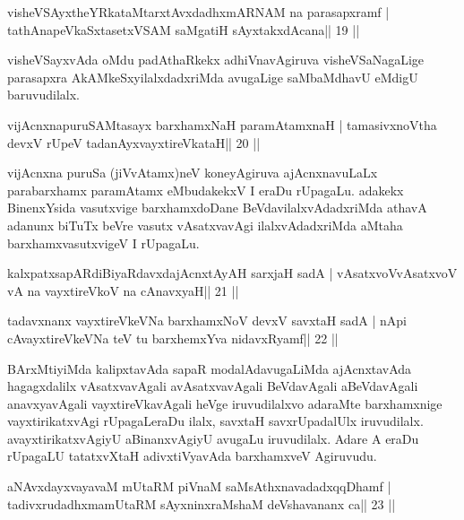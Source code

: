 \begin{shl}
visheVSAyxtheYRkataMtarxtAvxdadhxmARNAM na parasapxramf |
tathA\s napeVkaSxtasetxVSAM saMgatiH sAyxtakxdAcana\hfill || 19 ||
\end{shl}

\begin{artha}
visheVSayxvAda oMdu padAthaRkekx adhiVnavAgiruva visheVSaNagaLige parasapxra AkAMkeSxyilalxdadxriMda avugaLige saMbaMdhavU eMdigU baruvudilalx.
\end{artha}

\begin{shl}
vijAcnxnapuruSAMtasayx barxhamxNaH paramAtamxnaH |
tamasivxnoV\s tha devxV rUpeV tadanAyxvayxtireVkataH\hfill || 20 ||
\end{shl}

\begin{artha}
vijAcnxna puruSa (jiVvAtamx)neV koneyAgiruva ajAcnxnavuLaLx parabarxhamx paramAtamx eMbudakekxV I eraDu rUpagaLu. adakekx BinenxYsida vasutxvige barxhamxdoDane BeVdavilalxvAdadxriMda athavA adanunx biTuTx beVre vasutx vAsatxvavAgi ilalxvAdadxriMda aMtaha barxhamxvasutxvigeV I rUpagaLu.
\end{artha}



\begin{shl}
kalxpatxsapARdiBiyaRdavxdajAcnxtAyAH sarxjaH sadA |
vAsatxvoV\s vAsatxvoV vA na vayxtireVkoV na cAnavxyaH\hfill || 21 ||
\end{shl}

\begin{shl}
tadavxnanx vayxtireVkeVNa barxhamxNoV devxV savxtaH sadA |
nApi cAvayxtireVkeVNa teV tu barxhemxYva nidavxRyamf\hfill || 22 ||
\end{shl}

\begin{artha}
BArxMtiyiMda kalipxtavAda sapaR modalAdavugaLiMda ajAcnxtavAda
hagagxdalilx vAsatxvavAgali avAsatxvavAgali BeVdavAgali aBeVdavAgali
anavxyavAgali vayxtireVkavAgali heVge iruvudilalxvo adaraMte
barxhamxnige vayxtirikatxvAgi rUpagaLeraDu ilalx, savxtaH savxrUpadalUlx
iruvudilalx. avayxtirikatxvAgiyU aBinanxvAgiyU avugaLu iruvudilalx.
Adare A eraDu rUpagaLU tatatxvXtaH adivxtiVyavAda barxhamxveV Agiruvudu.
\end{artha}



\begin{shl}
aNAvxdayxvayavaM mUtaRM piVnaM saMsAthxnavadadxqqDhamf |
tadivxrudadhxmamUtaRM sAyxninxraMshaM deVshavananx ca\hfill || 23 ||
\end{shl}

